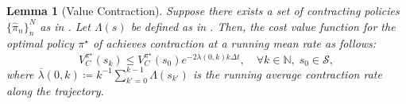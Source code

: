 \documentclass[lettersize,journal]{IEEEtran}
\newcommand{\mc}{\mathcal}
\newcommand{\mb}{\mathbb}
\newtheorem{lemma}{Lemma}
\begin{document}
\begin{lemma}[Value Contraction]\label{lemma:value_contraction}
    Suppose there exists a set of contracting policies $\{ \hat \pi_n\}_{n}^N$ as in .
    Let $\Lambda(s)$ be defined as in .
    Then, the cost value function for the optimal policy $\pi^\star$ of  achieves contraction at a running mean rate as follows:
    \begin{equation}\label{eqn:value_contraction_C}
        V^{\pi^\star}_{C}(s_{k}) \leq V^{\pi^\star}_{C}(s_0) e^{-2 \overline{\lambda}(0, k) k \Delta t}  , \quad \forall k \in \mb{N}, \; s_0 \in \mc{S},
    \end{equation}
    where $\overline{\lambda}(0, k) \coloneq k^{-1} \sum_{k'=0}^{k-1} \Lambda(s_{k'})$ is the running average contraction rate along the trajectory.
\end{lemma}
\end{document}

